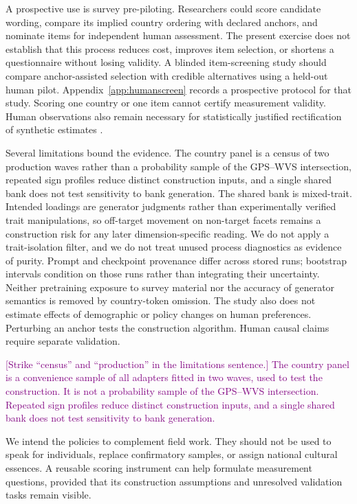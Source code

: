 A prospective use is survey pre-piloting. Researchers could score candidate wording, compare its implied country ordering with declared anchors, and nominate items for independent human assessment. The present exercise does not establish that this process reduces cost, improves item selection, or shortens a questionnaire without losing validity. A blinded item-screening study should compare anchor-assisted selection with credible alternatives using a held-out human pilot. Appendix~\ref{app:humanscreen} records a prospective protocol for that study. Scoring one country or one item cannot certify measurement validity. Human observations also remain necessary for statistically justified rectification of synthetic estimates \cite{krsteski2026}.

Several limitations bound the evidence. The country panel is a census of two production waves rather than a probability sample of the GPS--WVS intersection, repeated sign profiles reduce distinct construction inputs, and a single shared bank does not test sensitivity to bank generation. The shared bank is mixed-trait. Intended loadings are generator judgments rather than experimentally verified trait manipulations, so off-target movement on non-target facets remains a construction risk for any later dimension-specific reading. We do not apply a trait-isolation filter, and we do not treat unused process diagnostics as evidence of purity. Prompt and checkpoint provenance differ across stored runs; bootstrap intervals condition on those runs rather than integrating their uncertainty. Neither pretraining exposure to survey material nor the accuracy of generator semantics is removed by country-token omission. The study also does not estimate effects of demographic or policy changes on human preferences. Perturbing an anchor tests the construction algorithm. Human causal claims require separate validation.

\textcolor{purple}{[Strike ``census'' and ``production'' in the limitations sentence.] The country panel is a convenience sample of all adapters fitted in two waves, used to test the construction. It is not a probability sample of the GPS--WVS intersection. Repeated sign profiles reduce distinct construction inputs, and a single shared bank does not test sensitivity to bank generation.}


We intend the policies to complement field work. They should not be used to speak for individuals, replace confirmatory samples, or assign national cultural essences. A reusable scoring instrument can help formulate measurement questions, provided that its construction assumptions and unresolved validation tasks remain visible.
